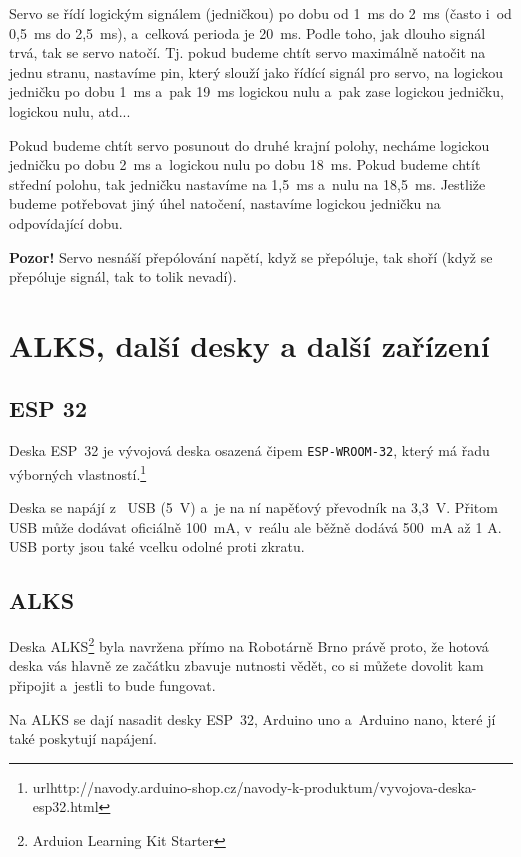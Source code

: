 Servo se řídí logickým signálem (jedničkou) po dobu od 1~ms do 2~ms (často i~od 0,5~ms do 2,5~ms), 
a~celková perioda je 20~ms. Podle toho, jak dlouho signál trvá, tak se servo natočí. 
Tj. pokud budeme chtít servo maximálně natočit na jednu stranu, nastavíme pin, který 
slouží jako řídící signál pro servo, na logickou jedničku po dobu 1~ms a~pak 19~ms logickou nulu a~pak zase logickou jedničku, logickou nulu, atd... 

Pokud budeme chtít servo posunout do druhé krajní polohy, necháme logickou jedničku po dobu 2~ms a~logickou nulu po dobu 18~ms. 
Pokud budeme chtít střední polohu, tak jedničku nastavíme na 1,5~ms a~nulu na 18,5~ms. 
Jestliže budeme potřebovat jiný úhel natočení, nastavíme logickou jedničku na odpovídající dobu.

{\bf Pozor!} Servo nesnáší přepólování napětí, když se přepóluje, tak shoří (když se přepóluje signál, tak to tolik nevadí).

\section{ALKS, další desky a další zařízení}

\subsection{ESP 32}

Deska ESP~32 je vývojová deska osazená čipem {\tt ESP-WROOM-32}, který má řadu výborných vlastností.\footnote{url{http://navody.arduino-shop.cz/navody-k-produktum/vyvojova-deska-esp32.html} }

Deska se napájí z~ USB (5~V) a~je na ní napěťový převodník
na 3,3~V. Přitom USB může dodávat oficiálně 100~mA, v~reálu ale běžně dodává 500~mA až 1 A. USB porty jsou také vcelku odolné proti zkratu.   

\subsection{ALKS}

Deska ALKS\footnote{Arduion Learning Kit Starter} byla navržena přímo na Robotárně Brno právě proto, že 
hotová deska   
vás hlavně ze začátku zbavuje nutnosti vědět, co si můžete dovolit kam připojit a~jestli to bude fungovat. 

Na ALKS se dají nasadit desky ESP~32, Arduino uno  a~Arduino nano, které jí také poskytují napájení.  

